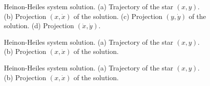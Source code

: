 \documentclass[twoside,english]{book}
\newcommand{\fourgraphs}[6]
  {
   \begin{figure}[htpb]
     
      \begin{minipage}[t]{0.5\textwidth} {#1} \end{minipage}
      \begin{minipage}[t]{0.5\textwidth} {#2} \end{minipage}
      
      \begin{minipage}[t]{0.5\textwidth} {#3} \end{minipage}
      \begin{minipage}[t]{0.5\textwidth} {#4} \end{minipage}
      \caption{#5} \label{#6} 
   \end{figure}  
  }
\begin{document}
      \fourgraphs
      { }
      { }
      { }
      { }
      {Heinon-Heiles system solution. 
      (a) Trajectory of the star $(x,y)$. 
      (b) Projection $(x,\dot{x})$ of the solution. 
      (c) Projection $(y,\dot{y})$ of the solution. 
      (d) Projection $(\dot{x},\dot{y})$.}
      {fig:exampleCad}

   \newcommand{\twographs}[4]
     {
      \begin{figure}[htpb]
         \begin{minipage}[t]{0.5\textwidth} {#1} \end{minipage}
         \begin{minipage}[t]{0.5\textwidth} {#2} \end{minipage}
         \caption{#3} \label{#4} 
      \end{figure}  
     } 
                           
       \twographs
        {}
        {}
        {Heinon-Heiles system solution. 
        (a) Trajectory of the star $(x,y)$. 
        (b) Projection $(x,\dot{x})$ of the solution. 
        }
        {fig:exampleDa} 
        
        \twographs
        {}
        {}
        {Heinon-Heiles system solution. 
        (a) Trajectory of the star $(x,y)$. 
        (b) Projection $(x,\dot{x})$ of the solution. 
        }
        {fig:exampleDb}   
          
\end{document}
